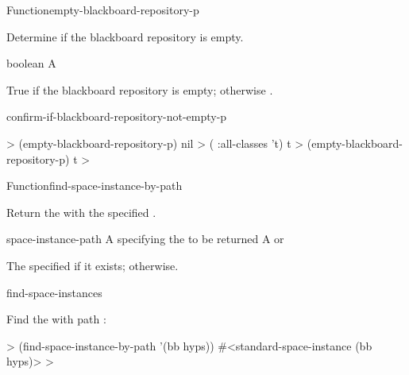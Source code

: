 \documentclass[10pt,twoside,english,pdftex]{article}
\begin{document}
\begin{functiondoc}{Function}{empty-blackboard-repository-p}{%
    }
%

\fnsyntax 

\fnpurpose Determine if the blackboard repository is empty.

\fnpackage {}

\fnmodule {}

\fnargs
\begin{args}{boolean}
\arg[boolean] A 
\end{args}

\fnreturns True if the blackboard repository is empty; otherwise \nil.

\begin{alsos}{confirm-if-blackboard-repository-not-empty-p}
\end{alsos}

\fnexamples 
%
%
%
\W\supp
\begin{example}
  > (empty-blackboard-repository-p)
  nil
  > ( :all-classes 't)
  t
  > (empty-blackboard-repository-p)
  t
  >
\end{example}

\end{functiondoc}


\begin{functiondoc}{Function}{find-space-instance-by-path}%
  {
    }

\fnsyntax

\fnpurpose Return the  with the specified
. 

\fnpackage {}

\fnmodule {}

\fnargs
\begin{args}{space-instance-path}
 A  specifying the
 to be returned 
 A  or \nil{}
\end{args}

\fnreturns The specified  if it exists; \nil{}
otherwise.

\begin{alsos}{find-space-instances}
\end{alsos}

\fnexample
Find the  with path :
%
\W\supp
\begin{example}
  > (find-space-instance-by-path '(bb hyps))
  #<standard-space-instance (bb hyps)>
  >
\end{example}

\end{functiondoc}
\end{document}
